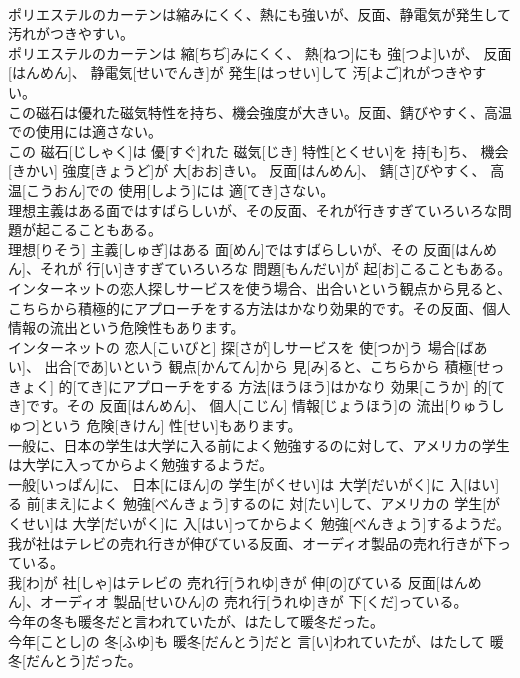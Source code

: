 \documentclass[8pt]{extreport}
\begin{document}
\begin{CJK}{UTF8}{min}
\\	ポリエステルのカーテンは縮みにくく、熱にも強いが、反面、静電気が発生して汚れがつきやすい。	
\\	ポリエステルのカーテンは 縮[ちぢ]みにくく、 熱[ねつ]にも 強[つよ]いが、 反面[はんめん]、 静電気[せいでんき]が 発生[はっせい]して 汚[よご]れがつきやすい。
\\	この磁石は優れた磁気特性を持ち、機会強度が大きい。反面、錆びやすく、高温での使用には適さない。	
\\	この 磁石[じしゃく]は 優[すぐ]れた 磁気[じき] 特性[とくせい]を 持[も]ち、 機会[きかい] 強度[きょうど]が 大[おお]きい。 反面[はんめん]、 錆[さ]びやすく、 高温[こうおん]での 使用[しよう]には 適[てき]さない。
\\	理想主義はある面ではすばらしいが、その反面、それが行きすぎていろいろな問題が起こることもある。	
\\	理想[りそう] 主義[しゅぎ]はある 面[めん]ではすばらしいが、その 反面[はんめん]、それが 行[い]きすぎていろいろな 問題[もんだい]が 起[お]こることもある。
\\	インターネットの恋人探しサービスを使う場合、出合いという観点から見ると、こちらから積極的にアプローチをする方法はかなり効果的です。その反面、個人情報の流出という危険性もあります。	
\\	インターネットの 恋人[こいびと] 探[さが]しサービスを 使[つか]う 場合[ばあい]、 出合[であ]いという 観点[かんてん]から 見[み]ると、こちらから 積極[せっきょく] 的[てき]にアプローチをする 方法[ほうほう]はかなり 効果[こうか] 的[てき]です。その 反面[はんめん]、 個人[こじん] 情報[じょうほう]の 流出[りゅうしゅつ]という 危険[きけん] 性[せい]もあります。
\\	一般に、日本の学生は大学に入る前によく勉強するのに対して、アメリカの学生は大学に入ってからよく勉強するようだ。	
\\	一般[いっぱん]に、 日本[にほん]の 学生[がくせい]は 大学[だいがく]に 入[はい]る 前[まえ]によく 勉強[べんきょう]するのに 対[たい]して、アメリカの 学生[がくせい]は 大学[だいがく]に 入[はい]ってからよく 勉強[べんきょう]するようだ。
\\	我が社はテレビの売れ行きが伸びている反面、オーディオ製品の売れ行きが下っている。	
\\	我[わ]が 社[しゃ]はテレビの 売れ行[うれゆ]きが 伸[の]びている 反面[はんめん]、オーディオ 製品[せいひん]の 売れ行[うれゆ]きが 下[くだ]っている。
\\	今年の冬も暖冬だと言われていたが、はたして暖冬だった。	
\\	今年[ことし]の 冬[ふゆ]も 暖冬[だんとう]だと 言[い]われていたが、はたして 暖冬[だんとう]だった。

\end{CJK}
\end{document}
